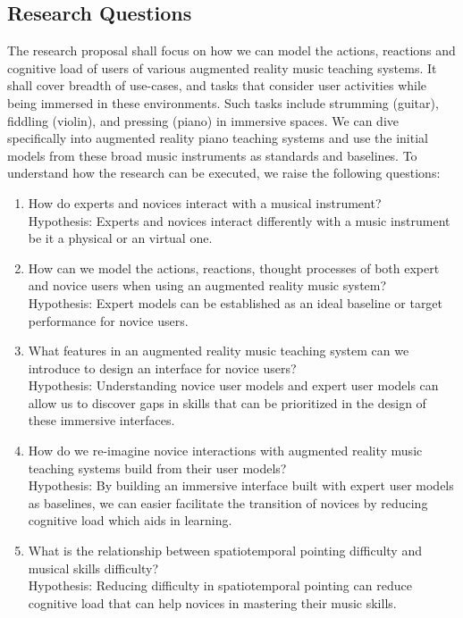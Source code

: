\documentclass{article}
\begin{document}
\subsection{Research Questions}
The research proposal shall focus on how we can model the actions, reactions and cognitive load of users of various augmented reality music teaching systems. It shall cover breadth of use-cases, and tasks that consider user activities while being immersed in these environments. Such tasks include strumming (guitar), fiddling (violin), and pressing (piano) in immersive spaces. We can dive specifically into augmented reality piano teaching systems  and use the initial models from these broad music instruments as standards and baselines. To understand how the research can be executed, we raise the following questions: 
\begin{enumerate}
    \item How do experts and novices interact with a musical instrument?\\
    Hypothesis: Experts and novices interact differently with a music instrument be it a physical or an virtual one. 
    \item How can we model the actions, reactions, thought processes of both expert and novice users when using an augmented reality music system?\\
    Hypothesis: Expert models can be established as an ideal baseline or target performance for novice users. 
    \item What features in an augmented reality music teaching system can we introduce to design an interface for novice users?\\
    Hypothesis: Understanding novice user models and expert user models can allow us to discover gaps in skills that can be prioritized in the design of these immersive interfaces. 
    \item How do we re-imagine novice interactions with augmented reality music teaching systems build from their user models?\\
    Hypothesis: By building an immersive interface built with expert user models as baselines, we can easier facilitate the transition of novices by reducing cognitive load which aids in learning.
    \item What is the relationship between spatiotemporal pointing difficulty and musical skills difficulty?\\
    Hypothesis: Reducing difficulty in spatiotemporal pointing can reduce cognitive load that can help novices in mastering their music skills. 
\end{enumerate}
\end{document}
